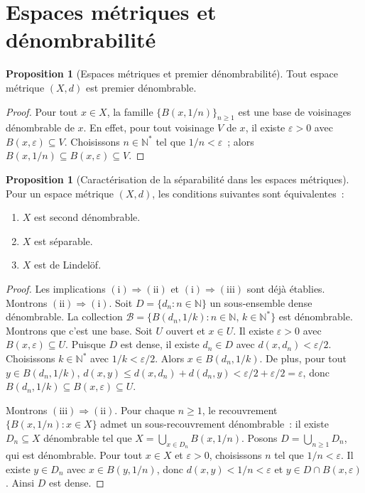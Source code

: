 \documentclass[12pt,a4paper,openany]{book}
\theoremstyle{definition}
\theoremstyle{cours}
\newtheorem{proposition}[theoreme]{Proposition}
\theoremstyle{coursnormal}
\newcommand{\N}{\mathbb{N}}
\newcommand{\B}{\mathcal{B}}
\begin{document}
\section{Espaces métriques et dénombrabilité}\label{sec:metriques-denombrabilite}

\begin{proposition}[Espaces métriques et premier dénombrabilité]\label{prop:metrique-A1}
  Tout espace métrique $(X,d)$ est premier dénombrable.
\end{proposition}

\begin{proof}
  Pour tout $x\in X$, la famille $\{B(x,1/n)\}_{n\geq 1}$ est une base de
  voisinages dénombrable de $x$. En effet, pour tout voisinage $V$ de $x$, il
  existe $\varepsilon>0$ avec $B(x,\varepsilon)\subseteq V$. Choisissons
  $n\in\N^*$ tel que $1/n<\varepsilon$~; alors
  $B(x,1/n)\subseteq B(x,\varepsilon)\subseteq V$.
\end{proof}

\begin{proposition}[Caractérisation de la séparabilité dans les espaces métriques]\label{prop:metrique-separable}
  Pour un espace métrique $(X,d)$, les conditions suivantes sont
  équivalentes~:
  \begin{enumerate}[label=\textup{(\roman*)}]
    \item $X$ est second dénombrable.
    \item $X$ est séparable.
    \item $X$ est de Lindelöf.
  \end{enumerate}
\end{proposition}

\begin{proof}
  Les implications $\mathrm{(i)\Rightarrow(ii)}$ et
  $\mathrm{(i)\Rightarrow(iii)}$ sont déjà établies. Montrons
  $\mathrm{(ii)\Rightarrow(i)}$. Soit $D=\{d_n : n\in\N\}$ un sous-ensemble
  dense dénombrable. La collection
  $\B = \{B(d_n,1/k) : n\in\N,\, k\in\N^*\}$ est dénombrable. Montrons que
  c'est une base. Soit $U$ ouvert et $x\in U$. Il existe $\varepsilon>0$ avec
  $B(x,\varepsilon)\subseteq U$. Puisque $D$ est dense, il existe $d_n\in D$
  avec $d(x,d_n)<\varepsilon/2$. Choisissons $k\in\N^*$ avec
  $1/k<\varepsilon/2$. Alors $x\in B(d_n,1/k)$. De plus, pour tout
  $y\in B(d_n,1/k)$,
  $d(x,y)\leq d(x,d_n)+d(d_n,y) < \varepsilon/2+\varepsilon/2 = \varepsilon$,
  donc $B(d_n,1/k)\subseteq B(x,\varepsilon)\subseteq U$.

  Montrons $\mathrm{(iii)\Rightarrow(ii)}$. Pour chaque $n\geq 1$, le
  recouvrement $\{B(x,1/n) : x\in X\}$ admet un sous-recouvrement
  dénombrable~: il existe $D_n\subseteq X$ dénombrable tel que
  $X=\bigcup_{x\in D_n} B(x,1/n)$. Posons $D=\bigcup_{n\geq 1} D_n$,
  qui est dénombrable. Pour tout $x\in X$ et $\varepsilon>0$, choisissons
  $n$ tel que $1/n<\varepsilon$. Il existe $y\in D_n$ avec $x\in B(y,1/n)$,
  donc $d(x,y)<1/n<\varepsilon$ et $y\in D\cap B(x,\varepsilon)$. Ainsi $D$
  est dense.
\end{proof}
\end{document}
